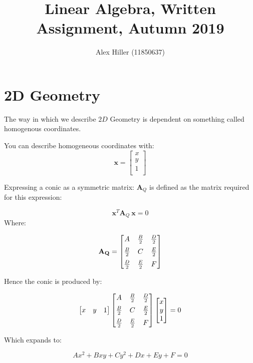 \documentclass{article}
\author{Alex Hiller (11850637)}
\title{Linear Algebra, Written Assignment, Autumn 2019}
\begin{document}
\section{2D Geometry} 
The way in which we describe  $ 2D $ Geometry is dependent on something called
homogenous coordinates.

You can describe homogeneous coordinates with:
\[%
    \mathbf{x} = 
    \begin{bmatrix}
        x \\		
        y \\
		1 \\
    \end{bmatrix}
\]%

Expressing a conic as a symmetric matrix: $ \mathbf{A}_{Q} $  is defined as the
matrix required for this expression:

\[%
    \mathbf{x}^{T}\mathbf{A}_{Q} \ \mathbf{x} = 0
\]%
Where:

\[%
    \mathbf{A_{Q} }
    = 
    \begin{bmatrix}\vspace{2mm}
        A            & \frac{B}{2}  & \frac{D}{2}  \\ \vspace{2mm}
		\frac{B}{2}  & C            & \frac{E}{2}  \\
		\frac{D}{2}  & \frac{E}{2}  & F \\		
    \end{bmatrix}
\]%

Hence the conic is produced by:

\[%
    \begin{bmatrix}
        x & y & 1 \\
    \end{bmatrix}
    \begin{bmatrix}\vspace{2mm}
        A            & \frac{B}{2}  & \frac{D}{2}  \\ \vspace{2mm}
		\frac{B}{2}  & C            & \frac{E}{2}  \\
		\frac{D}{2}  & \frac{E}{2}  & F \\		
    \end{bmatrix}
    \begin{bmatrix}
        x \\		y \\
		1 \\
    \end{bmatrix}
    = 0
\]%

Which expands to:

\[%
    Ax^{2}+Bxy+Cy^{2}+Dx+Ey+F = 0
\]%
\end{document}
